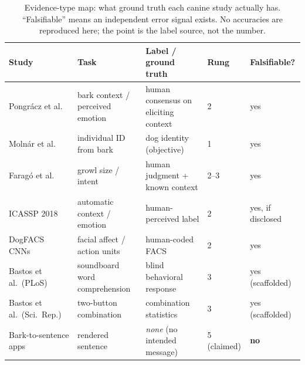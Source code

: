 \begin{table}[htbp]
\centering
\caption{Evidence-type map: what ground truth each canine study actually has.
``Falsifiable'' means an independent error signal exists. No accuracies are
reproduced here; the point is the label source, not the number.}
\label{tab:evidence}
\small
\setlength{\tabcolsep}{4pt}
\begin{tabular}{@{}p{3.0cm}p{3.4cm}p{4.0cm}p{1.0cm}p{2.2cm}@{}}
\toprule
\textbf{Study} & \textbf{Task} & \textbf{Label / ground truth} & \textbf{Rung} & \textbf{Falsifiable?} \\
\midrule
Pongr\'acz et al.~\cite{pongracz2005barks,pongracz2006acoustic} & bark context / perceived emotion & human consensus on eliciting context & 2 & yes \\
Moln\'ar et al.~\cite{molnar2006discriminate} & individual ID from bark & dog identity (objective) & 1 & yes \\
Farag\'o et al.~\cite{farago2017growls} & growl size / intent & human judgment + known context & 2--3 & yes \\
ICASSP 2018~\cite{icassp2018dogbark} & automatic context / emotion & human-perceived label & 2 & yes, if disclosed \\
DogFACS CNNs~\cite{sci2022explainable,sci2023cnnewoa,sci2025automated} & facial affect / action units & human-coded FACS & 2 & yes \\
Bastos et al.\ (PLoS)~\cite{bastos2024plos} & soundboard word comprehension & blind behavioral response & 3 & yes (scaffolded) \\
Bastos et al.\ (Sci.\ Rep.)~\cite{bastos2024scirep} & two-button combination & combination statistics & 3 & yes (scaffolded) \\
Bark-to-sentence apps~\cite{traini2024} & rendered sentence & \emph{none} (no intended message) & 5 (claimed) & \textbf{no} \\
\bottomrule
\end{tabular}
\end{table}

